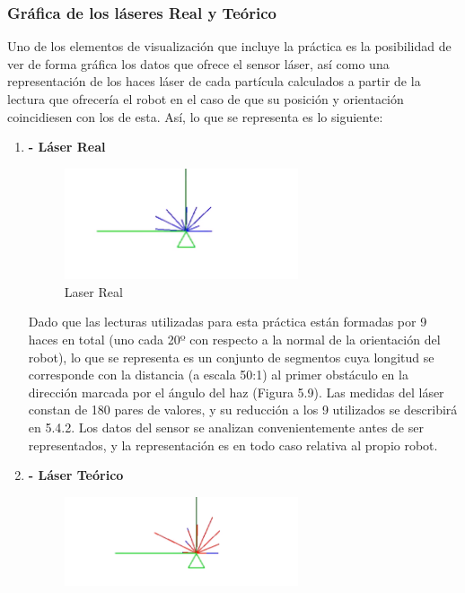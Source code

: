 \subsubsection{Gráfica de los láseres Real y Teórico}
Uno de los elementos de visualización que incluye la práctica es la posibilidad de ver de forma gráfica los datos que ofrece el sensor láser, así como una representación de los haces láser de cada partícula calculados a partir de la lectura que ofrecería el robot en el caso de que su posición y orientación coincidiesen con los de esta. Así, lo que se representa es lo siguiente:

\begin{enumerate}
	\item \textbf{- Láser Real}
	\begin{figure}[H]
		\begin{center}
			\includegraphics[width=0.65\textwidth]{figures/laserreal.png}
			\caption{Laser Real}
			\label{fig.laserreal}
			\end{center}
	\end{figure}
Dado que las lecturas utilizadas para esta práctica están formadas por 9 haces en total (uno cada 20º con respecto a la normal de la orientación del robot), lo que se representa es un conjunto de segmentos cuya longitud se corresponde con la distancia (a escala 50:1) al primer obstáculo en la dirección marcada por el ángulo del haz (Figura 5.9). Las medidas del láser constan de 180 pares de valores, y su reducción a los 9 utilizados se describirá en 5.4.2. Los datos del sensor se analizan convenientemente antes de ser representados, y la representación es en todo caso relativa al propio robot.
\item \textbf{- Láser Teórico}
	\begin{figure}[H]
		\begin{center}
			\includegraphics[width=0.65\textwidth]{figures/laserteorico.png}

\end{center}
\end{figure}
\end{enumerate}

